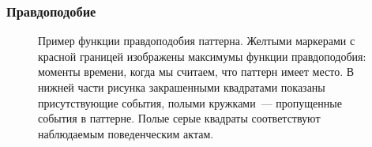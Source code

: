 \documentclass[smaller]{beamer}
\begin{document}
\begin{frame}
\frametitle{Правдоподобие}
\begin{figure}[H]
\noindent{}
\caption{ Пример функции правдоподобия паттерна. Желтыми маркерами с красной границей изображены максимумы функции правдоподобия: 
моменты времени, когда мы считаем, что паттерн имеет место.
В нижней части рисунка закрашенными квадратами показаны присутствующие
события, полыми кружками~--- пропущенные события в паттерне. Полые серые квадраты соответствуют наблюдаемым поведенческим актам.}
\end{figure}
\end{frame}  

% 
\end{document}
